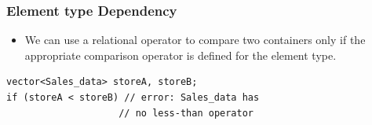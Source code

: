 \documentclass{beamer}
\newtheorem{Key points}{Key points}
\begin{document}
\begin{frame}[fragile]
  \frametitle{Element type Dependency}
  \begin{itemize}
  \item We can use a relational operator to compare two containers only if the
appropriate comparison operator is defined for the element type.
  \end{itemize}

\begin{lstlisting}
vector<Sales_data> storeA, storeB;
if (storeA < storeB) // error: Sales_data has
                    // no less-than operator

\end{lstlisting}
\end{frame}
\end{document}
